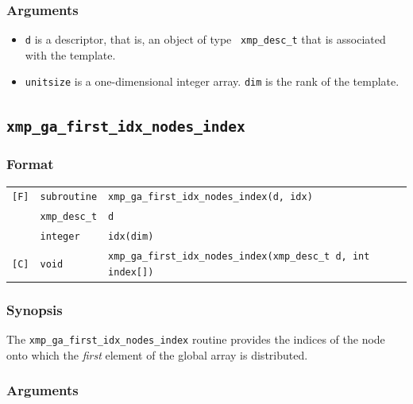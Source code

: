 \subsubsection*{Arguments}

\begin{itemize}
 \item {\tt d} is a descriptor, that is, an object of type {\tt
       xmp\_desc\_t} that is associated with the template.
 \item {\tt unitsize} is a one-dimensional integer array. {\tt dim} is
       the rank of the template.
\end{itemize}


\subsection{\tt xmp\_ga\_first\_idx\_nodes\_index}

\subsubsection*{Format}

\begin{tabular}{lll}

\verb![F]!&  {\tt subroutine}& {\tt xmp\_ga\_first\_idx\_nodes\_index(d, idx)}\\
          & {\tt xmp\_desc\_t} & {\tt d}\\
          & {\tt integer} & {\tt idx(dim)}\\

\verb![C]!&  {\tt void}& {\tt xmp\_ga\_first\_idx\_nodes\_index(xmp\_desc\_t d, int index[])}\\

\end{tabular}

\subsubsection*{Synopsis}

The {\tt xmp\_ga\_first\_idx\_nodes\_index} routine provides the indices
of the node onto which the {\it first} element of the global array is
distributed.

\subsubsection*{Arguments}

